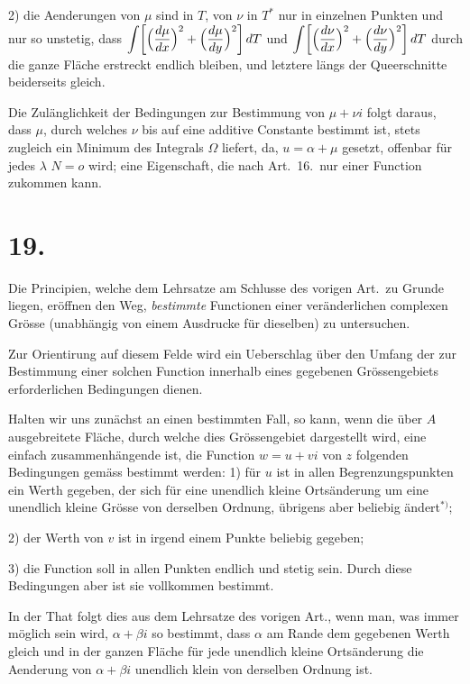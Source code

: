 \documentclass{article}
\begin{document}
2) die Aenderungen von $\mu$ sind in $T$, von $\nu$ in $T^*$ nur in einzelnen Punkten und nur so unstetig, dass $\displaystyle\int \biggl[\Bigl(\frac{d\mu}{dx}\Bigr)^2 + \Bigl(\frac{d\mu}{dy}\Bigr)^2\biggr]\,dT$ und $\displaystyle\int \biggl[\Bigl(\frac{d\nu}{dx}\Bigr)^2 + \Bigl(\frac{d\nu}{dy}\Bigr)^2\biggr]\,dT$ durch die ganze Fläche erstreckt endlich bleiben, und letztere längs der Queerschnitte beiderseits gleich.

Die Zulänglichkeit der Bedingungen zur Bestimmung von $\mu + \nu i$ folgt daraus, dass $\mu$, durch welches $\nu$ bis auf eine additive Constante bestimmt ist, stets zugleich ein Minimum des Integrals $\Omega$ liefert, da, $u = \alpha + \mu$ gesetzt, offenbar für jedes $\lambda$ $N = o$ wird; eine Eigenschaft, die nach Art.~16.\ nur einer Function zukommen kann.

\section*{19.}

Die Principien, welche dem Lehrsatze am Schlusse des vorigen Art.\ zu Grunde liegen, eröffnen den Weg, \emph{bestimmte} Functionen einer veränderlichen complexen Grösse (unabhängig von einem Ausdrucke für dieselben) zu untersuchen.

Zur Orientirung auf diesem Felde wird ein Ueberschlag über den Umfang der zur Bestimmung einer solchen Function innerhalb eines gegebenen Grössengebiets erforderlichen Bedingungen dienen.

Halten wir uns zunächst an einen bestimmten Fall, so kann, wenn die über $A$ ausgebreitete Fläche, durch welche dies Grössengebiet dargestellt wird, eine einfach zusammenhängende ist, die Function $w = u + vi$ von $z$ folgenden Bedingungen gemäss bestimmt werden:
1) für $u$ ist in allen Begrenzungspunkten ein Werth gegeben, der sich für eine unendlich kleine Ortsänderung um eine unendlich kleine Grösse von derselben Ordnung, übrigens aber beliebig ändert${}^{*)}$;


2) der Werth von $v$ ist in irgend einem Punkte beliebig gegeben;


3) die Function soll in allen Punkten endlich und stetig sein.
Durch diese Bedingungen aber ist sie vollkommen bestimmt.

In der That folgt dies aus dem Lehrsatze des vorigen Art., wenn man, was immer möglich sein wird, $\alpha + \beta i$ so bestimmt, dass $\alpha$ am Rande dem gegebenen Werth gleich und in der ganzen Fläche für jede unendlich kleine Ortsänderung die Aenderung von $\alpha + \beta i$ unendlich klein von derselben Ordnung ist.
\end{document}
